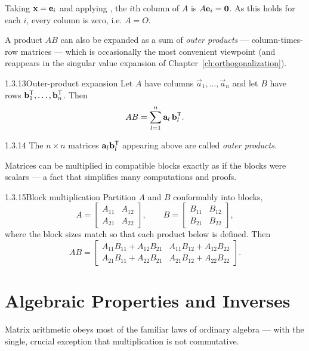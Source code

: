 \begin{prf}
Taking $\mathbf{x}=\mathbf{e}_i$ and applying , the $i$th column of $A$ is $A\mathbf{e}_i=\mathbf{0}$. As this holds for each $i$, every column is zero, i.e. $A=O$.
\end{prf}

A product $AB$ can also be expanded as a sum of \emph{outer products} --- column-times-row matrices --- which is occasionally the most convenient viewpoint (and reappears in the singular value expansion of Chapter~\ref{ch:orthogonalization}).

\begin{thms}{1.3.13}{Outer-product expansion}
Let $A$ have columns $\vec{a}_1,\dots,\vec{a}_n$ and let $B$ have rows $\mathbf{b}_1^{\mathsf{T}},\dots,\mathbf{b}_n^{\mathsf{T}}$. Then
\[
AB = \sum_{l=1}^{n}\mathbf{a}_l\,\mathbf{b}_l^{\mathsf{T}}.
\]
\end{thms}

\begin{rmks}{1.3.14}
The $n\times n$ matrices $\mathbf{a}_l\mathbf{b}_l^{\mathsf{T}}$ appearing above are called \emph{outer products}.
\end{rmks}

Matrices can be multiplied in compatible blocks exactly as if the blocks were scalars --- a fact that simplifies many computations and proofs.

\begin{thms}{1.3.15}{Block multiplication}
Partition $A$ and $B$ conformably into blocks,
\[
A=\begin{bmatrix}A_{11}&A_{12}\\ A_{21}&A_{22}\end{bmatrix},\qquad
B=\begin{bmatrix}B_{11}&B_{12}\\ B_{21}&B_{22}\end{bmatrix},
\]
where the block sizes match so that each product below is defined. Then
\[
AB=\begin{bmatrix} A_{11}B_{11}+A_{12}B_{21} & A_{11}B_{12}+A_{12}B_{22}\\ A_{21}B_{11}+A_{22}B_{21} & A_{21}B_{12}+A_{22}B_{22}\end{bmatrix}.
\]
\end{thms}

\section{Algebraic Properties and Inverses}
\label{sec:1.4}

Matrix arithmetic obeys most of the familiar laws of ordinary algebra --- with the single, crucial exception that multiplication is not commutative.

